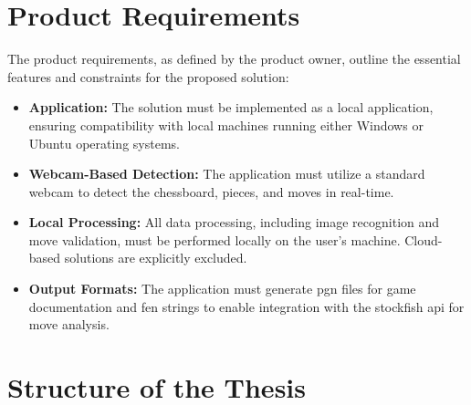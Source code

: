
\section{Product Requirements}

The product requirements, as defined by the product owner, outline the essential features and constraints for the proposed solution:

\begin{itemize}
    \item \textbf{Application:} The solution must be implemented as a local application, ensuring compatibility with local machines running either Windows or Ubuntu operating systems.

    \item \textbf{Webcam-Based Detection:} The application must utilize a standard webcam to detect the chessboard, pieces, and moves in real-time.

    \item \textbf{Local Processing:} All data processing, including image recognition and move validation, must be performed locally on the user's machine. Cloud-based solutions are explicitly excluded.

    \item \textbf{Output Formats:} The application must generate \gls{pgn} files for game documentation and \gls{fen} strings to enable integration with the \gls{stockfish} \gls{api} for move analysis.
\end{itemize}

\section{Structure of the Thesis}

